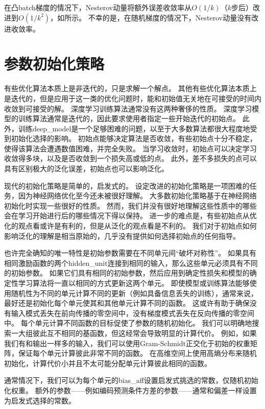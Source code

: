 
在凸\gls{batch}梯度的情况下，Nesterov动量将额外误差收敛率从$O(1/k)$（$k$步后）改进到$O(1/k^2)$，如\cite{Nesterov83b}所示。
不幸的是，在随机梯度的情况下，Nesterov动量没有改进收敛率。

\section{参数初始化策略}
\label{sec:parameter_initialization_strategies}
有些优化算法本质上是非迭代的，只是求解一个解点。
其他有些优化算法本质上是迭代的，但是应用于这一类的优化问题时，能和初始值无关地在可接受的时间内收敛到可接受的解。
深度学习训练算法通常没有这两种奢侈的性质。
深度学习模型的训练算法通常是迭代的，因此要求使用者指定一些开始迭代的初始点。
此外，训练\gls{deep_model}是一个足够困难的问题，以至于大多数算法都很大程度地受到初始化选择的影响。
初始点能够决定算法是否收敛，有些初始点十分不稳定，使得该算法会遭遇数值困难，并完全失败。
当学习收敛时，初始点可以决定学习收敛得多块，以及是否收敛到一个损失高或低的点。
此外，差不多损失的点可以具有区别极大的泛化误差，初始点也可以影响泛化。


现代的初始化策略是简单的，启发式的。
设定改进的初始化策略是一项困难的任务，因为神经网络优化至今还未被很好理解。
大多数初始化策略基于在神经网络初始化时实现一些很好的性质。
然而，我们并没有很好地理解这些性质中的哪些会在学习开始进行后的哪些情况下得以保持。
进一步的难点是，有些初始点从优化的观点看或许是有利的，但是从泛化的观点看是不利的。
我们对于初始点如何影响泛化的理解是相当原始的，几乎没有提供如何选择初始点的任何指导。

也许完全确知的唯一特性是初始参数需要在不同单元间``破坏对称性''。
如果具有相同激励函数的两个\gls{hidden_unit}连接到相同的输入，那么这些单元必须具有不同的初始参数。
如果它们具有相同的初始参数，然后应用到确定性损失和模型的确定性学习算法将一直以相同的方式更新这两个单元。
即使模型或训练算法能够使用随机性为不同的单元计算不同的更新（例如具备信息丢失的训练），通常来说，最好还是初始化每个单元使其和其他单元计算不同的函数。
这或许有助于确保没有输入模式丢失在前向传播的零空间中，没有梯度模式丢失在反向传播的零空间中。
每个单元计算不同函数的目标促使了参数的随机初始化。
我们可以明确地搜索一大组彼此互不相同的基函数，但这经常会导致明显的计算代价。  
例如，如果我们有和输出一样多的输入，我们可以使用Gram-Schmidt正交化于初始的权重矩阵，保证每个单元计算彼此非常不同的函数。
在高维空间上使用高熵分布来随机初始化，计算代价小并且不太可能分配单元计算彼此相同的函数。

通常情况下，我们可以为每个单元的\gls{bias_aff}设置启发式挑选的常数，仅随机初始化权重。
额外的参数——例如编码预测条件方差的参数——通常和偏差一样设置为启发式选择的常数。

